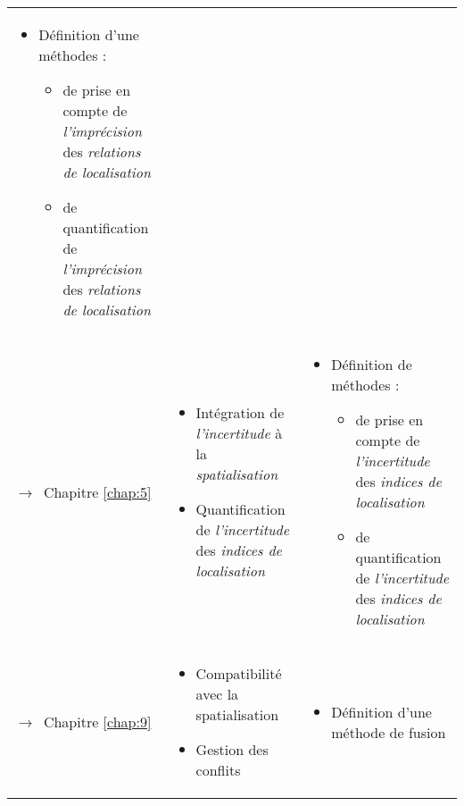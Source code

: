 \begin{tabular}{L{.2\textheight}L{.35\textheight}L{.35\textheight}}
\begin{minipage}{.35\textheight}
    \begin{itemize}
    \item Définition d'une méthodes :
      \begin{itemize}
      \item de prise en compte de \emph{l’imprécision} des
        \emph{relations de localisation}
      \item de quantification de \emph{l'imprécision} des
        \emph{relations de localisation}
      \end{itemize}
    \end{itemize}
  \end{minipage} \\
  \addlinespace[.5cm]
  
{\par\footnotesize\hspace{.25cm}$\longrightarrow$~Chapitre
\ref{chap:5}} & \begin{minipage}{.35\textheight}
    \begin{itemize}
    \item Intégration de \emph{l'incertitude} à la
      \emph{spatialisation}
    \item Quantification de \emph{l'incertitude} des \emph{indices de
        localisation}
    \end{itemize}
  \end{minipage}& \begin{minipage}{.35\textheight}
    \begin{itemize}
    \item Définition de méthodes :
      \begin{itemize}
      \item de prise en compte de \emph{l’incertitude} des
        \emph{indices de localisation}
      \item de quantification de \emph{l'incertitude} des
        \emph{indices de localisation}
      \end{itemize}
    \end{itemize}
  \end{minipage} \\

{\par\footnotesize\hspace{.25cm}$\longrightarrow$~Chapitre
\ref{chap:9}} & \begin{minipage}{.35\textheight}
    \begin{itemize}
    \item Compatibilité avec la spatialisation
    \item Gestion des conflits
    \end{itemize}
  \end{minipage}& \begin{minipage}{.35\textheight}
    \begin{itemize}
    \item Définition d'une méthode de fusion
    \end{itemize}
  \end{minipage} \\
  

\end{tabular}
